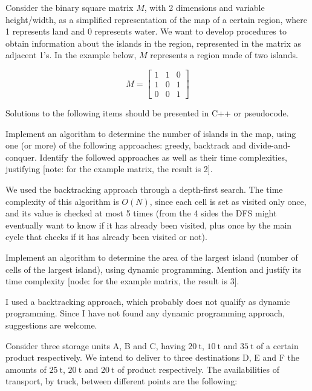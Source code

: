 \documentclass{cal}
\begin{document}
{

Consider the binary square matrix $M$, with 2 dimensions and variable height/width, as a simplified representation of the map of a certain region, where 1 represents land and 0 represents water. We want to develop procedures to obtain information about the islands in the region, represented in the matrix as adjacent 1's. In the example below, $M$ represents a region made of two islands.

\begin{equation*}
    M = \begin{bmatrix}
        1 & 1 & 0 \\
        1 & 0 & 1 \\
        0 & 0 & 1
    \end{bmatrix}
\end{equation*}

Solutions to the following items should be presented in C++ or pseudocode.

Implement an algorithm to determine the number of islands in the map, using one (or more) of the following approaches: greedy, backtrack and divide-and-conquer. Identify the followed approaches as well as their time complexities, justifying [note: for the example matrix, the result is 2].

\ansseparator



We used the backtracking approach through a depth-first search. The time complexity of this algorithm is $O(N)$, since each cell is set as visited only once, and its value is checked at most 5 times (from the 4 sides the DFS might eventually want to know if it has already been visited, plus once by the main cycle that checks if it has already been visited or not).

Implement an algorithm to determine the area of the largest island (number of cells of the largest island), using dynamic programming. Mention and justify its time complexity [node: for the example matrix, the result is 3].

\ansseparator



I used a backtracking approach, which probably does not qualify as dynamic programming. Since I have not found any dynamic programming approach, suggestions are welcome.

\newpage
{}
Consider three storage units A, B and C, having $\SI{20}{\tonne}$, $\SI{10}{\tonne}$ and $\SI{35}{\tonne}$ of a certain product respectively. We intend to deliver to three destinations D, E and F the amounts of $\SI{25}{\tonne}$, $\SI{20}{\tonne}$ and $\SI{20}{\tonne}$ of product respectively. The availabilities of transport, by truck, between different points are the following:

}
\end{document}
